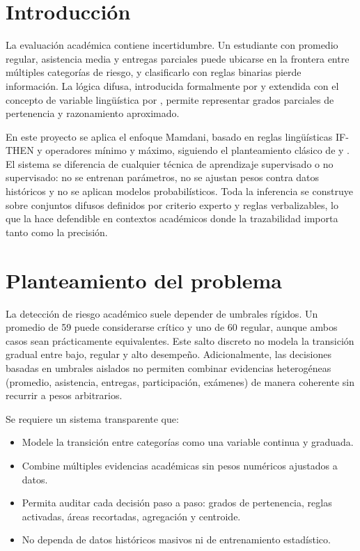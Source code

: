 \section{Introducción}

La evaluación académica contiene incertidumbre. Un estudiante con promedio regular, asistencia media y entregas parciales puede ubicarse en la frontera entre múltiples categorías de riesgo, y clasificarlo con reglas binarias pierde información. La lógica difusa, introducida formalmente por \citet{zadeh1965fuzzy} y extendida con el concepto de variable lingüística por \citet{zadeh1975linguistic}, permite representar grados parciales de pertenencia y razonamiento aproximado.

En este proyecto se aplica el enfoque Mamdani, basado en reglas lingüísticas IF-THEN y operadores mínimo y máximo, siguiendo el planteamiento clásico de \citet{mamdani1974application} y \citet{mamdani1975experiment}. El sistema se diferencia de cualquier técnica de aprendizaje supervisado o no supervisado: no se entrenan parámetros, no se ajustan pesos contra datos históricos y no se aplican modelos probabilísticos. Toda la inferencia se construye sobre conjuntos difusos definidos por criterio experto y reglas verbalizables, lo que la hace defendible en contextos académicos donde la trazabilidad importa tanto como la precisión.

\section{Planteamiento del problema}

La detección de riesgo académico suele depender de umbrales rígidos. Un promedio de 59 puede considerarse crítico y uno de 60 regular, aunque ambos casos sean prácticamente equivalentes. Este salto discreto no modela la transición gradual entre bajo, regular y alto desempeño. Adicionalmente, las decisiones basadas en umbrales aislados no permiten combinar evidencias heterogéneas (promedio, asistencia, entregas, participación, exámenes) de manera coherente sin recurrir a pesos arbitrarios.

Se requiere un sistema transparente que:

\begin{itemize}
  \item Modele la transición entre categorías como una variable continua y graduada.
  \item Combine múltiples evidencias académicas sin pesos numéricos ajustados a datos.
  \item Permita auditar cada decisión paso a paso: grados de pertenencia, reglas activadas, áreas recortadas, agregación y centroide.
  \item No dependa de datos históricos masivos ni de entrenamiento estadístico.
\end{itemize}

